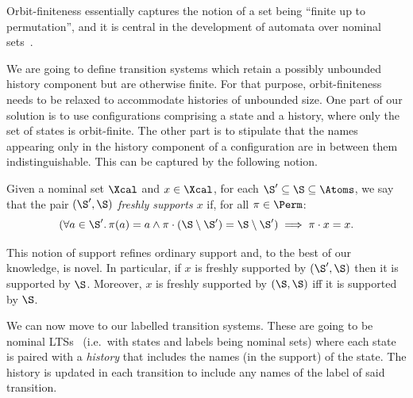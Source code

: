 Orbit-finiteness essentially captures the notion of a set being ``finite up to permutation'', and it is central in the development of automata over nominal sets~\cite{automatanominalsets}.

We are going to define transition systems which retain a possibly unbounded history component but are otherwise finite. For that purpose, orbit-finiteness needs to be relaxed to accommodate histories of unbounded size. One part of our solution is to use configurations comprising a state and a history, where only the set of states is orbit-finite. The other part is to stipulate that the names appearing only in the history component of a configuration are in between them indistinguishable. This can be captured by the following notion.

\begin{definition}
  Given a nominal set $\Xcal$ and $x\in\Xcal$, for each $\S'\subseteq\S\subseteq\Atoms$, we say that the pair \emph{$(\S',\S)$ freshly supports $x$} if, for all $\pi\in\Perm$:
  \[ (\forall a\in\S'.\,\pi(a)=a\land\pi\cdot (\S\setminus\S')=\S\setminus\S')
    \implies \pi\cdot x=x.
  \]
\end{definition}

This notion of support refines ordinary support and, to the best of our knowledge, is novel. In particular, if $x$ is freshly supported by $(\S',\S)$ then it is supported by $\S$. Moreover, $x$ is freshly supported by $(\S,\S)$ iff it is supported by $\S$.



We can now move to our labelled transition systems. These are going to be nominal LTSs~\cite{automatanominalsets} (i.e.\ with states and labels being nominal sets) where each state is paired with a \emph{history} that includes the names (in the support) of the state. The history is updated in each transition to include any names of the label of said transition. 

